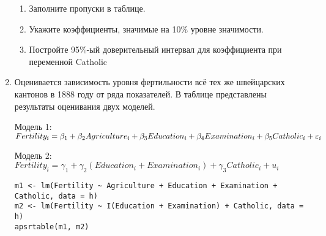 \documentclass[12pt, a4paper]{article}
\theoremstyle{definition}
\begin{document}
\begin{enumerate}
\begin{enumerate}
\item Заполните пропуски в таблице.
\item Укажите коэффициенты, значимые на 10\% уровне значимости.
\item Постройте 95\%-ый доверительный интервал для коэффициента при переменной Catholic
\end{enumerate}


\item Оценивается зависимость уровня фертильности всё тех же швейцарских кантонов в 1888 году от ряда показателей. В таблице представлены результаты оценивания двух моделей.

Модель 1: $Fertility_i=\beta_1+\beta_2 Agriculture_i+\beta_3 Education_i+\beta_4 Examination_i+\beta_5 Catholic_i+\varepsilon_i$

Модель 2: $Fertility_i=\gamma_1+\gamma_2 (Education_i+Examination_i)+\gamma_3 Catholic_i+u_i$

\begin{verbatim}
m1 <- lm(Fertility ~ Agriculture + Education + Examination + Catholic, data = h)
m2 <- lm(Fertility ~ I(Education + Examination) + Catholic, data = h)
apsrtable(m1, m2)
\end{verbatim}


\end{enumerate}
\end{document}
